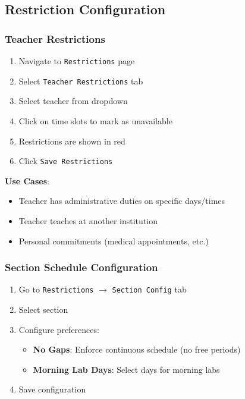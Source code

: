 \documentclass[12pt,a4paper]{article}
\begin{document}
\subsection{Restriction Configuration}

\subsubsection{Teacher Restrictions}
\begin{enumerate}
    \item Navigate to \texttt{Restrictions} page
    \item Select \texttt{Teacher Restrictions} tab
    \item Select teacher from dropdown
    \item Click on time slots to mark as unavailable
    \item Restrictions are shown in red
    \item Click \texttt{Save Restrictions}
\end{enumerate}

\textbf{Use Cases}:
\begin{itemize}
    \item Teacher has administrative duties on specific days/times
    \item Teacher teaches at another institution
    \item Personal commitments (medical appointments, etc.)
\end{itemize}

\subsubsection{Section Schedule Configuration}
\begin{enumerate}
    \item Go to \texttt{Restrictions} $\rightarrow$ \texttt{Section Config} tab
    \item Select section
    \item Configure preferences:
    \begin{itemize}
        \item \textbf{No Gaps}: Enforce continuous schedule (no free periods)
        \item \textbf{Morning Lab Days}: Select days for morning labs
    \end{itemize}
    \item Save configuration
\end{enumerate}
\end{document}
